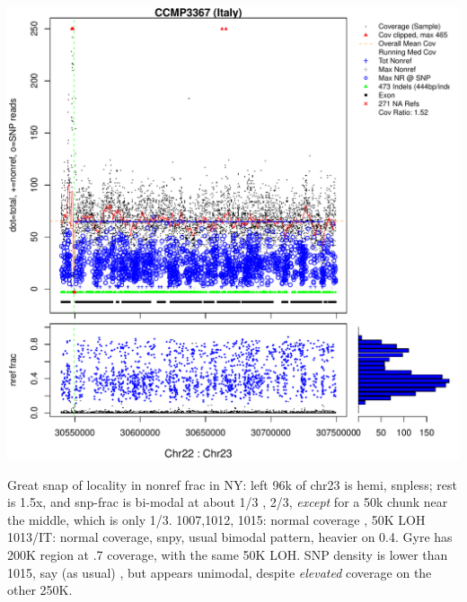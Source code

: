 \documentclass{article}\usepackage[]{graphicx}\usepackage[]{color}
\makeatletter
\def\maxwidth{ %
  \ifdim\Gin@nat@width>\linewidth
    \linewidth
  \else
    \Gin@nat@width
  \fi
}
\newenvironment{knitrout}{}{} %
\makeatother
\begin{document}
\begin{knitrout}
{\includegraphics[width=\maxwidth]{figs-knitr/unnamed-chunk-41-7} 

}



\end{knitrout}

Great snap of locality in nonref frac in NY: left 96k of chr23 is hemi, snpless; rest is 1.5x, and snp-frac is bi-modal at about 1/3 , 2/3, \emph{except} for a 50k chunk near the middle, which is only 1/3.
1007,1012, 1015: normal coverage , 50K LOH
1013/IT: normal coverage, snpy, usual bimodal pattern, heavier on 0.4.
Gyre has 200K  region at .7 coverage, with the same 50K LOH.  SNP density is lower than 1015, say  (as usual) , but appears unimodal, despite \emph{elevated} coverage on the other 250K.
\end{document}
